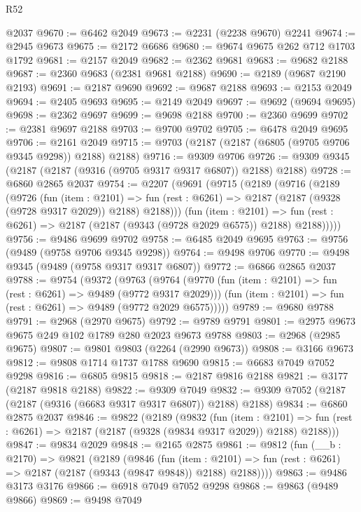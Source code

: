 \begin{lexlean}{R52}
\begin{coremodule}
    @2037
@9670 := @6462 @2049
@9673 := @2231 (@2238 @9670) @2241
@9674 := @2945 @9673
@9675 := @2172 @6686
@9680 := @9674 @9675 @262 @712 @1703 @1792
@9681 := @2157 @2049
@9682 := @2362 @9681
@9683 := @9682 @2188
@9687 := @2360 @9683 (@2381 @9681 @2188)
@9690 := @2189 (@9687 @2190 @2193)
@9691 := @2187 @9690
@9692 := @9687 @2188
@9693 := @2153 @2049
@9694 := @2405 @9693
@9695 := @2149 @2049
@9697 := @9692 (@9694 @9695)
@9698 := @2362 @9697
@9699 := @9698 @2188
@9700 := @2360 @9699
@9702 := @2381 @9697 @2188
@9703 := @9700 @9702
@9705 := @6478 @2049 @9695
@9706 := @2161 @2049
@9715 := @9703 (@2187 (@2187 (@6805 (@9705 @9706 @9345 @9298)) @2188) @2188)
@9716 := @9309 @9706
@9726 := @9309 @9345 (@2187 (@2187 (@9316 (@9705 @9317 @9317 @6807)) @2188) @2188)
@9728 := @6860 @2865 @2037
@9754 := @2207
    (@9691
      (@9715
        (@2189
          (@9716
            (@2189
              (@9726
                (fun (item : @2101) =>
                fun (rest : @6261) => @2187 (@2187 (@9328 (@9728 @9317 @2029)) @2188) @2188)))
            (fun (item : @2101) =>
            fun (rest : @6261) => @2187 (@2187 (@9343 (@9728 @2029 @6575)) @2188) @2188)))))
@9756 := @9486 @9699 @9702
@9758 := @6485 @2049 @9695
@9763 := @9756 (@9489 (@9758 @9706 @9345 @9298))
@9764 := @9498 @9706
@9770 := @9498 @9345 (@9489 (@9758 @9317 @9317 @6807))
@9772 := @6866 @2865 @2037
@9788 := @9754
    (@9372
      (@9763
        (@9764
          (@9770 (fun (item : @2101) => fun (rest : @6261) => @9489 (@9772 @9317 @2029)))
          (fun (item : @2101) => fun (rest : @6261) => @9489 (@9772 @2029 @6575)))))
@9789 := @9680 @9788
@9791 := @2968 (@2970 @9675)
@9792 := @9789 @9791
@9801 := @2975 @9673 @9675 @249 @102 @1789 @280 @2023 @9673 @9788
@9803 := @2968 (@2985 @9675)
@9807 := @9801 @9803 (@2264 (@2990 @9673))
@9808 := @3166 @9673
@9812 := @9808 @1714 @1737 @1788 @9690
@9815 := @6683 @7049 @7052 @9298
@9816 := @6805 @9815
@9818 := @2187 @9816 @2188
@9821 := @3177 (@2187 @9818 @2188)
@9822 := @9309 @7049
@9832 := @9309 @7052 (@2187 (@2187 (@9316 (@6683 @9317 @9317 @6807)) @2188) @2188)
@9834 := @6860 @2875 @2037
@9846 := @9822
    (@2189
      (@9832
        (fun (item : @2101) =>
        fun (rest : @6261) => @2187 (@2187 (@9328 (@9834 @9317 @2029)) @2188) @2188)))
@9847 := @9834 @2029
@9848 := @2165 @2875
@9861 := @9812
    (fun (__b : @2170) =>
    @9821
      (@2189
        (@9846
          (fun (item : @2101) =>
          fun (rest : @6261) => @2187 (@2187 (@9343 (@9847 @9848)) @2188) @2188))))
@9863 := @9486 @3173 @3176
@9866 := @6918 @7049 @7052 @9298
@9868 := @9863 (@9489 @9866)
@9869 := @9498 @7049

\end{coremodule}
\end{lexlean}
